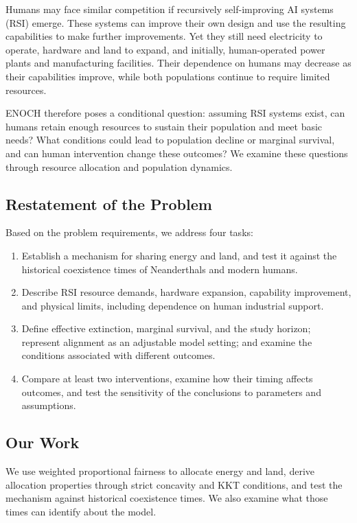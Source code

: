 \documentclass[12pt,a4paper]{article}
\theoremstyle{remark}
\begin{document}
Humans may face similar competition if recursively self-improving AI systems (RSI) emerge. These systems can improve their own design and use the resulting capabilities to make further improvements. Yet they still need electricity to operate, hardware and land to expand, and initially, human-operated power plants and manufacturing facilities. Their dependence on humans may decrease as their capabilities improve, while both populations continue to require limited resources.

ENOCH therefore poses a conditional question: assuming RSI systems exist, can humans retain enough resources to sustain their population and meet basic needs? What conditions could lead to population decline or marginal survival, and can human intervention change these outcomes? We examine these questions through resource allocation and population dynamics.

\subsection{Restatement of the Problem}

Based on the problem requirements, we address four tasks:

\begin{enumerate}
    \item Establish a mechanism for sharing energy and land, and test it against the historical coexistence times of Neanderthals and modern humans.

    \item Describe RSI resource demands, hardware expansion, capability improvement, and physical limits, including dependence on human industrial support.

    \item Define effective extinction, marginal survival, and the study horizon; represent alignment as an adjustable model setting; and examine the conditions associated with different outcomes.

    \item Compare at least two interventions, examine how their timing affects outcomes, and test the sensitivity of the conclusions to parameters and assumptions.
\end{enumerate}

\subsection{Our Work}

We use weighted proportional fairness to allocate energy and land, derive allocation properties through strict concavity and KKT conditions, and test the mechanism against historical coexistence times. We also examine what those times can identify about the model.
\end{document}
